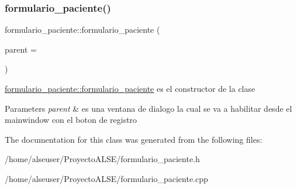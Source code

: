\subsubsection{\texorpdfstring{formulario\+\_\+paciente()}{formulario\_paciente()}}
{\footnotesize\ttfamily formulario\+\_\+paciente\+::formulario\+\_\+paciente (\begin{DoxyParamCaption}\item[{Q\+Widget $\ast$}]{parent = {} }\end{DoxyParamCaption})\hspace{0.3cm}{\ttfamily [explicit]}}



\hyperlink{classformulario__paciente_ad200fdaad0f9dca8f1b55831d8fee231}{formulario\+\_\+paciente\+::formulario\+\_\+paciente} es el constructor de la clase 


\begin{DoxyParams}{Parameters}
{\em parent} & es una ventana de dialogo la cual se va a habilitar desde el mainwindow con el boton de registro \\
\hline
\end{DoxyParams}


The documentation for this class was generated from the following files\+:\begin{DoxyCompactItemize}
\item 
/home/alseuser/\+Proyecto\+A\+L\+S\+E/formulario\+\_\+paciente.\+h\item 
/home/alseuser/\+Proyecto\+A\+L\+S\+E/formulario\+\_\+paciente.\+cpp\end{DoxyCompactItemize}
